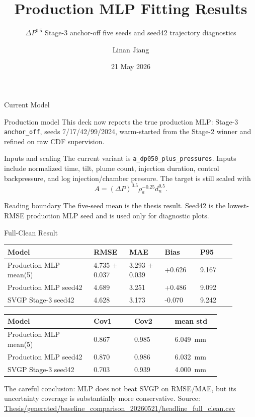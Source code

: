 \documentclass[aspectratio=169,11pt]{beamer}
\title[NN Fitting Results]{Production MLP Fitting Results}
\subtitle{\(\Delta P^{0.5}\) Stage-3 anchor-off five seeds and seed42 trajectory diagnostics}
\author{Linan Jiang}
\institute{Aalto University}
\date{21 May 2026}
\newcommand{\good}[1]{\textcolor{green!45!black}{#1}}
\newcommand{\blue}[1]{\textcolor{blue!65!black}{#1}}
\newcommand{\src}[1]{\vfill{\tiny\textcolor{gray!75!black}{Source: \url{#1}}}}
\begin{document}
\begin{frame}
  \titlepage
\end{frame}

\begin{frame}{Current Model}
\small
\begin{block}{Production model}
This deck now reports the true production MLP: Stage-3 \texttt{anchor\_off},
seeds 7/17/42/99/2024, warm-started from the Stage-2 winner and refined on raw
CDF supervision.
\end{block}

\begin{block}{Inputs and scaling}
\footnotesize
The current variant is \texttt{a\_dp050\_plus\_pressures}. Inputs include
normalized time, tilt, plume count, injection duration, control backpressure,
and log injection/chamber pressure. The target is still scaled with
\[
A=(\Delta P)^{0.5}\rho_a^{-0.25}d_n^{0.5}.
\]
\end{block}

\begin{block}{Reading boundary}
\footnotesize
The five-seed mean is the thesis result. Seed42 is the lowest-RMSE production
MLP seed and is used only for diagnostic plots.
\end{block}
\end{frame}

\begin{frame}{Full-Clean Result}
\small
\begin{tabular}{L{0.34\linewidth}R{0.14\linewidth}R{0.14\linewidth}R{0.14\linewidth}R{0.14\linewidth}}
\toprule
Model & RMSE & MAE & Bias & P95 \\
\midrule
Production MLP mean(5) & \good{4.735 \(\pm\) 0.037} & 3.293 \(\pm\) 0.039 & +0.626 & 9.167 \\
Production MLP seed42 & \good{4.689} & 3.251 & +0.486 & 9.092 \\
SVGP Stage-3 seed42 & \blue{4.628} & \blue{3.173} & -0.070 & 9.242 \\
\bottomrule
\end{tabular}

\vspace{0.7em}
\begin{tabular}{L{0.34\linewidth}R{0.16\linewidth}R{0.16\linewidth}R{0.18\linewidth}}
\toprule
Model & Cov1 & Cov2 & mean std \\
\midrule
Production MLP mean(5) & \good{0.867} & \good{0.985} & \SI{6.049}{mm} \\
Production MLP seed42 & 0.870 & 0.986 & \SI{6.032}{mm} \\
SVGP Stage-3 seed42 & 0.703 & 0.939 & \SI{4.000}{mm} \\
\bottomrule
\end{tabular}

\vspace{0.6em}
\footnotesize
The careful conclusion: MLP does not beat SVGP on RMSE/MAE, but its uncertainty
coverage is substantially more conservative.
\src{Thesis/generated/baseline_comparison_20260521/headline_full_clean.csv}
\end{frame}
\end{document}
